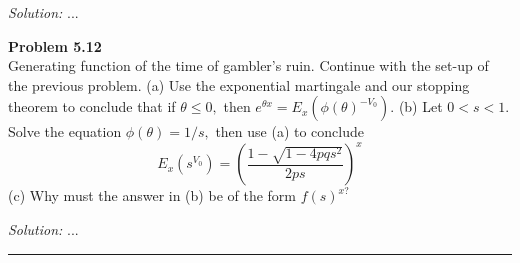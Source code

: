 \documentclass[a4paper, 11pt]{article}
\newenvironment{problem}[2][Problem]
    { \begin{mdframed}[backgroundcolor=gray!20] \textbf{#1 #2} \\}
    {  \end{mdframed}}
\newenvironment{solution}
    {\textit{Solution:}}
    {}
\begin{document}
\begin{solution}
...
\end{solution} 
\begin{problem}{5.12}
Generating function of the time of gambler's ruin. Continue with the set-up of the previous problem. (a) Use the exponential martingale and our stopping theorem to conclude that if $\theta \leq 0,$ then $e^{\theta x}=E_{x}\left(\phi(\theta)^{-V_{0}}\right) .$ (b) Let $0<s<1 .$ Solve the equation $\phi(\theta)=1 / s,$ then use (a) to conclude
$$
E_{x}\left(s^{V_{0}}\right)=\left(\frac{1-\sqrt{1-4 p q s^{2}}}{2 p s}\right)^{x}
$$
(c) Why must the answer in (b) be of the form $f(s)^{x ?}$
\end{problem}
\begin{solution}
...
\end{solution} 

%
\noindent\rule{7in}{2.8pt}
\end{document}
